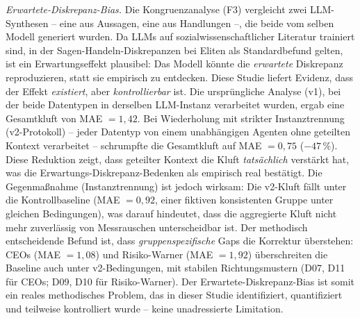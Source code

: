 \documentclass[12pt,a4paper]{article}
\begin{document}
\emph{Erwartete-Diskrepanz-Bias.} Die Kongruenzanalyse (F3) vergleicht zwei LLM-Synthesen -- eine aus Aussagen, eine aus Handlungen --, die beide vom selben Modell generiert wurden. Da LLMs auf sozialwissenschaftlicher Literatur trainiert sind, in der Sagen-Handeln-Diskrepanzen bei Eliten als Standardbefund gelten, ist ein Erwartungseffekt plausibel: Das Modell k\"onnte die \emph{erwartete} Diskrepanz reproduzieren, statt sie empirisch zu entdecken. Diese Studie liefert Evidenz, dass der Effekt \emph{existiert}, aber \emph{kontrollierbar} ist. Die urspr\"ungliche Analyse (v1), bei der beide Datentypen in derselben LLM-Instanz verarbeitet wurden, ergab eine Gesamtkluft von MAE $= 1{,}42$. Bei Wiederholung mit strikter Instanztrennung (v2-Protokoll) -- jeder Datentyp von einem unabh\"angigen Agenten ohne geteilten Kontext verarbeitet -- schrumpfte die Gesamtkluft auf MAE $= 0{,}75$ ($-47\,\%$). Diese Reduktion zeigt, dass geteilter Kontext die Kluft \emph{tats\"achlich} verst\"arkt hat, was die Erwartungs-Diskrepanz-Bedenken als empirisch real best\"atigt. Die Gegenma\ss{}nahme (Instanztrennung) ist jedoch wirksam: Die v2-Kluft f\"allt unter die Kontrollbaseline (MAE $= 0{,}92$, einer fiktiven konsistenten Gruppe unter gleichen Bedingungen), was darauf hindeutet, dass die aggregierte Kluft nicht mehr zuverl\"assig von Messrauschen unterscheidbar ist. Der methodisch entscheidende Befund ist, dass \emph{gruppenspezifische} Gaps die Korrektur \"uberstehen: CEOs (MAE $= 1{,}08$) und Risiko-Warner (MAE $= 1{,}92$) \"uberschreiten die Baseline auch unter v2-Bedingungen, mit stabilen Richtungsmustern (D07, D11 f\"ur CEOs; D09, D10 f\"ur Risiko-Warner). Der Erwartete-Diskrepanz-Bias ist somit ein reales methodisches Problem, das in dieser Studie identifiziert, quantifiziert und teilweise kontrolliert wurde -- keine unadressierte Limitation.
\end{document}
